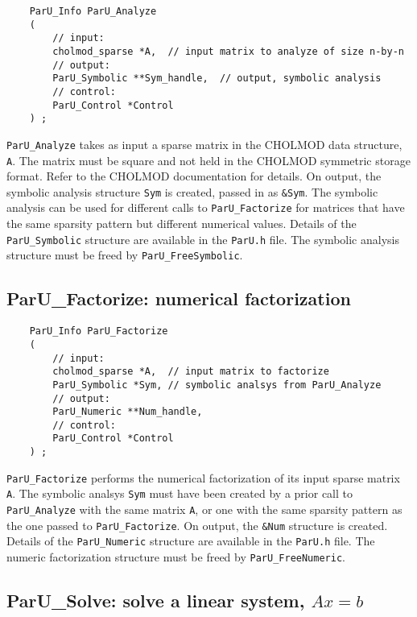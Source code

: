 \documentclass[12pt]{article}
\begin{document}
    {\footnotesize
    \begin{verbatim}
    ParU_Info ParU_Analyze
    (
        // input:
        cholmod_sparse *A,  // input matrix to analyze of size n-by-n
        // output:
        ParU_Symbolic **Sym_handle,  // output, symbolic analysis
        // control:
        ParU_Control *Control
    ) ; \end{verbatim}}

    \verb'ParU_Analyze' takes as input a sparse matrix in the CHOLMOD data
    structure, \verb'A'.  The matrix must be square and not held in the CHOLMOD
    symmetric storage format.  Refer to the CHOLMOD documentation for details.
    On output, the symbolic analysis structure \verb'Sym' is created, passed in as
    \verb'&Sym'.  The symbolic analysis can be used for different calls to
    \verb'ParU_Factorize' for matrices that have the same sparsity pattern but
    different numerical values.  Details of the \verb'ParU_Symbolic' structure
    are available in the \verb'ParU.h' file.
    The symbolic analysis structure must be freed by \verb'ParU_FreeSymbolic'.

\subsection{{\sf ParU\_Factorize}: numerical factorization}

    {\footnotesize
    \begin{verbatim}
    ParU_Info ParU_Factorize
    (
        // input:
        cholmod_sparse *A,  // input matrix to factorize
        ParU_Symbolic *Sym, // symbolic analsys from ParU_Analyze
        // output:
        ParU_Numeric **Num_handle,
        // control:
        ParU_Control *Control
    ) ; \end{verbatim}}

    \verb'ParU_Factorize' performs the numerical factorization of its input
    sparse matrix \verb'A'.  The symbolic analsys \verb'Sym' must have been
    created by a prior call to \verb'ParU_Analyze' with the same matrix
    \verb'A', or one with the same sparsity pattern as the one passed to
    \verb'ParU_Factorize'.  On output, the \verb'&Num' structure is created.
    Details of the \verb'ParU_Numeric' structure are available in the \verb'ParU.h' file.
    The numeric factorization structure must be freed by \verb'ParU_FreeNumeric'.

\subsection{{\sf ParU\_Solve}: solve a linear system, $Ax=b$}
\end{document}
